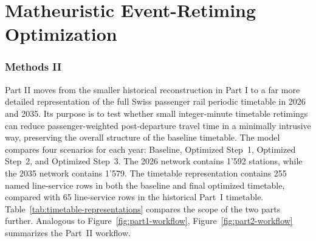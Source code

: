 \documentclass[preprint,12pt]{elsarticle}
\begin{document}
\clearpage
\part{Matheuristic Event-Retiming Optimization}\label{sec:part2}
\section{Methods II}\label{sec:methods-part2}
Part II moves from the smaller historical reconstruction in Part I to a far more detailed representation of the full Swiss passenger rail periodic timetable in 2026 and 2035. Its purpose is to test whether small integer-minute timetable retimings can reduce passenger-weighted post-departure travel time in a minimally intrusive way, preserving the overall structure of the baseline timetable. The model compares four scenarios for each year: Baseline, Optimized Step~1, Optimized Step~2, and Optimized Step~3. The 2026 network contains 1'592 stations, while the 2035 network contains 1'579. The timetable representation contains 255 named line-service rows in both the baseline and final optimized timetable, compared with 65 line-service rows in the historical Part~I timetable. Table~\ref{tab:timetable-representations} compares the scope of the two parts further. Analogous to Figure~\ref{fig:part1-workflow}, Figure~\ref{fig:part2-workflow} summarizes the Part~II workflow.
\end{document}
